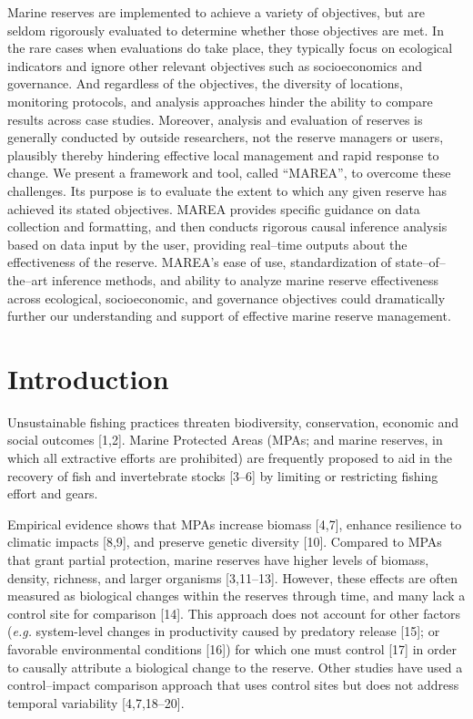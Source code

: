 \documentclass[12pt,]{article}
\begin{document}
Marine reserves are implemented to achieve a variety of objectives, but
are seldom rigorously evaluated to determine whether those objectives
are met. In the rare cases when evaluations do take place, they
typically focus on ecological indicators and ignore other relevant
objectives such as socioeconomics and governance. And regardless of the
objectives, the diversity of locations, monitoring protocols, and
analysis approaches hinder the ability to compare results across case
studies. Moreover, analysis and evaluation of reserves is generally
conducted by outside researchers, not the reserve managers or users,
plausibly thereby hindering effective local management and rapid
response to change. We present a framework and tool, called ``MAREA'',
to overcome these challenges. Its purpose is to evaluate the extent to
which any given reserve has achieved its stated objectives. MAREA
provides specific guidance on data collection and formatting, and then
conducts rigorous causal inference analysis based on data input by the
user, providing real--time outputs about the effectiveness of the
reserve. MAREA's ease of use, standardization of state--of--the--art
inference methods, and ability to analyze marine reserve effectiveness
across ecological, socioeconomic, and governance objectives could
dramatically further our understanding and support of effective marine
reserve management.

\section{Introduction}\label{introduction}

Unsustainable fishing practices threaten biodiversity, conservation,
economic and social outcomes {[}1,2{]}. Marine Protected Areas (MPAs;
and marine reserves, in which all extractive efforts are prohibited) are
frequently proposed to aid in the recovery of fish and invertebrate
stocks {[}3--6{]} by limiting or restricting fishing effort and gears.

Empirical evidence shows that MPAs increase biomass {[}4,7{]}, enhance
resilience to climatic impacts {[}8,9{]}, and preserve genetic diversity
{[}10{]}. Compared to MPAs that grant partial protection, marine
reserves have higher levels of biomass, density, richness, and larger
organisms {[}3,11--13{]}. However, these effects are often measured as
biological changes within the reserves through time, and many lack a
control site for comparison {[}14{]}. This approach does not account for
other factors (\emph{e.g.} system-level changes in productivity caused
by predatory release {[}15{]}; or favorable environmental conditions
{[}16{]}) for which one must control {[}17{]} in order to causally
attribute a biological change to the reserve. Other studies have used a
control--impact comparison approach that uses control sites but does not
address temporal variability {[}4,7,18--20{]}.
\end{document}
